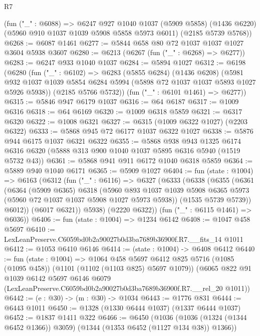 \begin{lexlean}{R7}
\begin{coremodule}
    (fun ("_" : @6088) =>
    @6247
      @927
      @1040
      @1037
      (@5909 @5858)
      (@1436 @6220)
      (@5960 @910 @1037 @1039 @5908 @5858 @5973 @6011)
      (@2185 @5739 @5768))
@6268 := @6087 @1461
@6277 := @5844 @658 @80 @72 @1037 @1037 @1027 @3604 @5938 @3607
@6280 := @6213 (@6267 (fun ("_" : @6268) => @6277))
@6283 := @6247 @933 @1040 @1037
@6284 := @5894 @1027
@6312 := @6198
    (@6280
      (fun ("_" : @6102) =>
      @6283
        (@5855 @6284)
        (@1436 @6208)
        (@5981 @932 @1037 @1039 @5854 @6284 @5994 (@5898 @72 @1037 @1037 @5893 @1027 @5926 @5938))
        (@2185 @5766 @5732))
      (fun ("_" : @6101 @1461) => @6277))
@6315 := @5846 @947 @6179 @1037
@6316 := @64 @6187
@6317 := @1009 @6316
@6318 := @64 @6169
@6320 := @1009 @6318 @5859
@6321 := @6317 @6320
@6322 := @1008 @6321
@6327 := @6315 (@1009 @6322 @1027) (@2203 @6322)
@6333 := @5868 @945 @72 @6177 @1037 @6322 @1027
@6338 := @5876 @944 @6175 @1037 @6321 @6322
@6355 := @5868
    @938
    @943
    @1325
    @6174
    @6316
    @6320
    (@5888 @313 @900 @1040 @1037 @5895 @6316 @5940 (@1519 @5732 @43))
@6361 := @5868 @941 @911 @6172 @1040 @6318 @5859
@6364 := @5889 @940 @1040 @6171
@6365 := @5909 @1027
@6404 := fun (state : @1004) =>
  @6163
    (@6312
      (fun ("_" : @6116) =>
      @6327
        (@6333
          (@6338
            (@6355
              (@6361
                (@6364
                  (@5909 @6365)
                  @6318
                  (@5960
                    @893
                    @1037
                    @1039
                    @5908
                    @6365
                    @5973
                    (@5960 @72 @1037 @1037 @5908 @1027 @5973 @5938))
                  (@1535 @5739 @5739))
                @6012))
            (@6017 @6321))
          @5938)
        (@2220 @6322))
      (fun ("_" : @6115 @1461) => @6036))
@6406 := fun (state : @1004) => @1234 @6142
@6408 := @1047 @458 @5697
@6410 := LexLeanPreserve.C6059bd0b2a90027b0d3ba7689b36900f.R7.__fits_14 @1011
@6412 := @1053 @6410 @6146
@6414 := (state : @1004) -> @6408 @6412
@6440 := fun (state : @1004) =>
  @1064
    @458
    @5697
    @6412
    @825
    @5716
    (@1085 (@1095 @458))
    (@1101 (@1102 (@1103 @825) @5697 @1079))
    (@6065
      @822
      @91
      @1039
      @6142
      @5697
      @6146
      @6079
      (LexLeanPreserve.C6059bd0b2a90027b0d3ba7689b36900f.R7.__rel_20 @1011))
@6442 := (e : @30) -> (m : @30) -> @1034
@6443 := @1776 @831
@6444 := @6443 @1011
@6450 := @1328 (@1330 @6444 @1037) (@1337 @6444 @1037)
@6452 := @1837 @1411 @322
@6466 := @6450
    (@1036 (@1036 (@1324 (@1344 @6452 @1366)) @3059) (@1344 (@1353 @6452 (@1127 @134 @38)) @1366))

\end{coremodule}
\end{lexlean}
